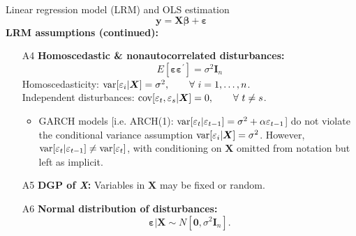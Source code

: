 \documentclass{beamer}
\begin{document}
\begin{frame}{Linear regression model (LRM) and OLS estimation}
$$
\bm{y} = \bm{X\beta} + \bm{\varepsilon}
$$
\textbf{LRM assumptions (continued):}
\medskip
\begin{enumerate}
    \item[A4] \textbf{Homoscedastic \& nonautocorrelated disturbances:}$$E[\bm{\varepsilon\varepsilon}^{\prime}]=\sigma^2\bm{I}_n$$ Homoscedasticity: $\textnormal{var}[\varepsilon_i|\bm{X}]=\sigma^2, \qquad \forall~i=1,\dots,n$.\\Independent disturbances: $\textnormal{cov}[\varepsilon_t,\varepsilon_s|\bm{X}]=0, \qquad \forall~t \neq s$.\\ \smallskip 
    \tiny{
    \begin{itemize}
        \item GARCH models [i.e. ARCH(1): $\textnormal{var}[\varepsilon_t|\varepsilon_{t-1}]=\sigma^2+\alpha \varepsilon_{t-1}$] do not violate the conditional variance assumption $\textnormal{var}[\varepsilon_i|\bm{X}]=\sigma^2$. However, $\textnormal{var}[\varepsilon_t|\varepsilon_{t-1}] \neq \textnormal{var}[\varepsilon_t]$, with conditioning on $\bm{X}$ omitted from notation but left as implicit.
    \end{itemize}}
    \normalsize
    \item[A5] \textbf{DGP of \textit{X}:} Variables in $\bm{X}$ may be fixed or random.
    \item[A6] \textbf{Normal distribution of disturbances:} $$\bm{\varepsilon} | \bm{X} \sim N[\bm{0}, \sigma^2\bm{I}_n].$$
\end{enumerate}
\end{frame}
\end{document}
